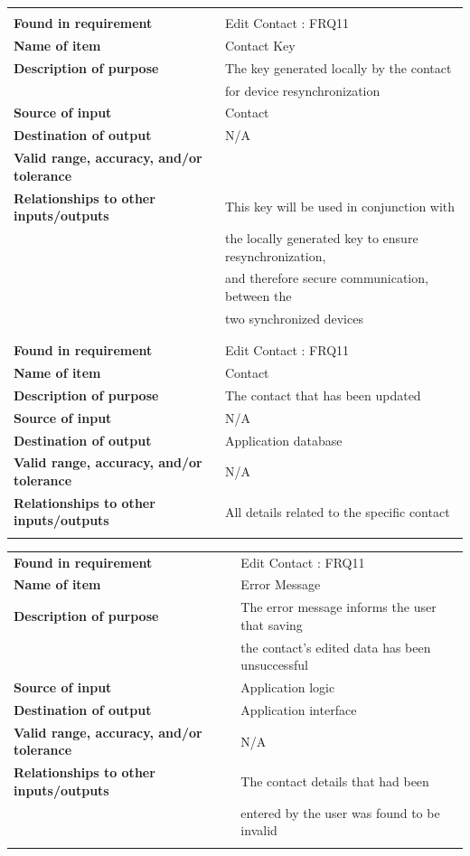 \begin{tabular}{ll}
&\\
\textbf{Found in requirement}&Edit Contact : FRQ11\\
\textbf{Name of item}&Contact Key\\
\textbf{Description of purpose}&The key generated locally by the contact\\& for device resynchronization\\
\textbf{Source of input}&Contact\\
\textbf{Destination of output}&N/A\\
\textbf{Valid range, accuracy, and/or tolerance}&\\
\textbf{Relationships to other inputs/outputs}&This key will be used in conjunction with\\& the locally generated key to ensure resynchronization,\\& and therefore secure communication, between the\\& two synchronized devices\\\\
&\\
\textbf{Found in requirement}&Edit Contact : FRQ11\\
\textbf{Name of item}&Contact\\
\textbf{Description of purpose}&The contact that has been updated\\
\textbf{Source of input}&N/A\\
\textbf{Destination of output}&Application database\\
\textbf{Valid range, accuracy, and/or tolerance}&N/A\\
\textbf{Relationships to other inputs/outputs}&All details related to the specific contact\\
&\\
\end{tabular}
\newpage
\begin{tabular}{ll}
\textbf{Found in requirement}&Edit Contact : FRQ11\\
\textbf{Name of item}&Error Message\\
\textbf{Description of purpose}&The error message informs the user that saving\\& the contact's edited data has been unsuccessful\\
\textbf{Source of input}&Application logic\\
\textbf{Destination of output}&Application interface\\
\textbf{Valid range, accuracy, and/or tolerance}&N/A\\
\textbf{Relationships to other inputs/outputs}&The contact details that had been\\& entered by the user was found to be invalid\\
&\\
\end{tabular}

